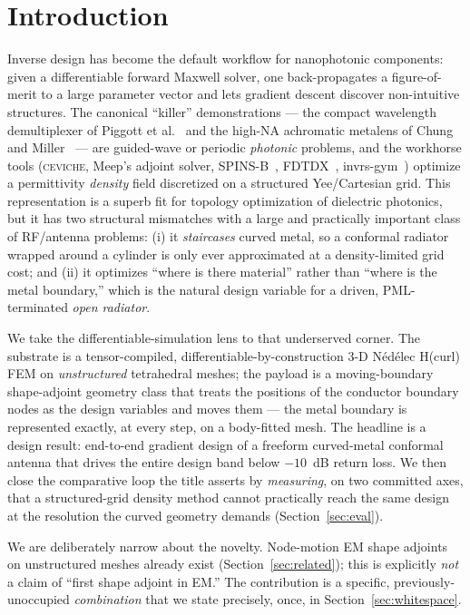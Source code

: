 \documentclass{anvil-paper}
\begin{document}
\section{Introduction}
\label{sec:intro}

Inverse design has become the default workflow for nanophotonic components:
given a differentiable forward Maxwell solver, one back-propagates a
figure-of-merit to a large parameter vector and lets gradient descent discover
non-intuitive structures. The canonical ``killer'' demonstrations --- the
compact wavelength demultiplexer of Piggott et al.~\cite{piggott2015} and the
high-NA achromatic metalens of Chung and Miller~\cite{chung2020} --- are
guided-wave or periodic \emph{photonic} problems, and the workhorse tools
(\textsc{ceviche}, Meep's adjoint solver, SPINS-B~\cite{su_spinsb},
FDTDX~\cite{fdtdx}, invrs-gym~\cite{invrsgym}) optimize a permittivity
\emph{density} field discretized on a structured Yee/Cartesian grid. This
representation is a superb fit for topology optimization of dielectric
photonics, but it has two structural mismatches with a large and practically
important class of RF/antenna problems: (i) it \emph{staircases} curved metal,
so a conformal radiator wrapped around a cylinder is only ever approximated at a
density-limited grid cost; and (ii) it optimizes ``where is there material''
rather than ``where is the metal boundary,'' which is the natural design
variable for a driven, PML-terminated \emph{open radiator}.

We take the differentiable-simulation lens to that underserved corner. The
substrate is a tensor-compiled, differentiable-by-construction 3-D N\'ed\'elec
H(curl) FEM on \emph{unstructured} tetrahedral meshes; the payload is a
moving-boundary shape-adjoint geometry class that treats the positions of the
conductor boundary nodes as the design variables and moves them --- the metal
boundary is represented exactly, at every step, on a body-fitted mesh. The
headline is a design result: end-to-end gradient design of a freeform
curved-metal conformal antenna that drives the entire design band below
$-10$~dB return loss. We then close the comparative loop the title asserts by
\emph{measuring}, on two committed axes, that a structured-grid density method
cannot practically reach the same design at the resolution the curved geometry
demands (Section~\ref{sec:eval}).

We are deliberately narrow about the novelty. Node-motion EM shape adjoints on
unstructured meshes already exist (Section~\ref{sec:related}); this is
explicitly \emph{not} a claim of ``first shape adjoint in EM.'' The contribution
is a specific, previously-unoccupied \emph{combination} that we state precisely,
once, in Section~\ref{sec:whitespace}.
\end{document}
